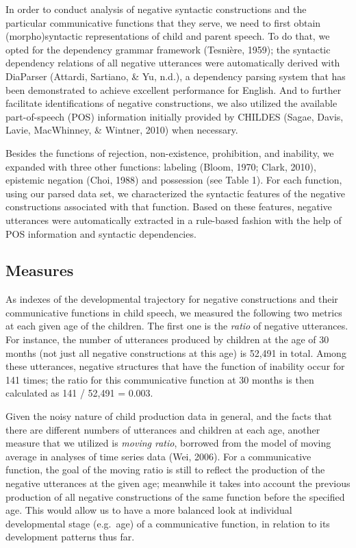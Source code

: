 \documentclass[10pt, letterpaper]{article}
\begin{document}
In order to conduct analysis of negative syntactic constructions and the
particular communicative functions that they serve, we need to first
obtain (morpho)syntactic representations of child and parent speech. To
do that, we opted for the dependency grammar framework (Tesnière, 1959);
the syntactic dependency relations of all negative utterances were
automatically derived with DiaParser (Attardi, Sartiano, \& Yu, n.d.), a
dependency parsing system that has been demonstrated to achieve
excellent performance for English. And to further facilitate
identifications of negative constructions, we also utilized the
available part-of-speech (POS) information initially provided by CHILDES
(Sagae, Davis, Lavie, MacWhinney, \& Wintner, 2010) when necessary.

Besides the functions of rejection, non-existence, prohibition, and
inability, we expanded with three other functions: labeling (Bloom,
1970; Clark, 2010), epistemic negation (Choi, 1988) and possession (see
Table 1). For each function, using our parsed data set, we characterized
the syntactic features of the negative constructions associated with
that function. Based on these features, negative utterances were
automatically extracted in a rule-based fashion with the help of POS
information and syntactic dependencies.

\hypertarget{measures}{%
\subsection{Measures}\label{measures}}

As indexes of the developmental trajectory for negative constructions
and their communicative functions in child speech, we measured the
following two metrics at each given age of the children. The first one
is the \emph{ratio} of negative utterances. For instance, the number of
utterances produced by children at the age of 30 months (not just all
negative constructions at this age) is 52,491 in total. Among these
utterances, negative structures that have the function of inability
occur for 141 times; the ratio for this communicative function at 30
months is then calculated as 141 / 52,491 = 0.003.

Given the noisy nature of child production data in general, and the
facts that there are different numbers of utterances and children at
each age, another measure that we utilized is \emph{moving ratio},
borrowed from the model of moving average in analyses of time series
data (Wei, 2006). For a communicative function, the goal of the moving
ratio is still to reflect the production of the negative utterances at
the given age; meanwhile it takes into account the previous production
of all negative constructions of the same function before the specified
age. This would allow us to have a more balanced look at individual
developmental stage (e.g.~age) of a communicative function, in relation
to its development patterns thus far.
\end{document}
